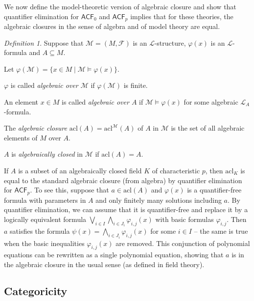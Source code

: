 \documentclass[a4paper, 11pt]{amsart}
\theoremstyle{remark}
\newtheorem{definition}[definition]{Definition}
\newcommand{\acl}{\mathrm{acl}}
\newcommand{\cF}{\mathcal F}
\newcommand{\cL}{\mathcal L}
\newcommand{\cM}{\mathcal M}
\newenvironment{enumerate-(a)}{\begin{enumerate}[label={\upshape (\alph*)}, leftmargin=2pc]}{\end{enumerate}}
\begin{document}
We now define the model-theoretic version of algebraic closure and show that quantifier elimination for $\mathsf{ACF}_0$ and $\mathsf{ACF}_p$ implies that for these theories, the algebraic closures in the sense of algebra and of model theory are equal.  

\begin{definition} 
Suppose that $\cM=(M,\cF)$ is an $\cL$-structure, $\varphi(x)$ is an $\cL$-formula and $A\subseteq M$. 
\begin{enumerate-(a)} 
\item 
Let $\varphi(\cM)=\{x\in M\mid\cM\models \varphi(x)\}$. 
\item 
$\varphi$ is called \emph{algebraic over $\cM$} if $\varphi(\cM)$ is finite. 
\item 
An element $x\in M$ is called \emph{algebraic over $A$} if $\cM\models \varphi(x)$ for some algebraic $\cL_A$-formula. 
\item 
The \emph{algebraic closure} $\acl(A)=\acl^\cM(A)$ of $A$ in $\cM$ is the set of all algebraic elements of $M$ over $A$. 
\item 
$A$ is \emph{algebraically closed} in $\cM$ if $\acl(A)=A$. 
\end{enumerate-(a)} 
\end{definition} 

If $A$ is a subset of an algebraically closed field $K$ of characteristic $p$, then $\acl_K$ is equal to the standard algebraic closure (from algebra) by quantifier elimination for $\mathsf{ACF}_p$. To see this, suppose that $a\in\acl(A)$ and $\varphi(x)$ is a quantifier-free formula with parameters in $A$ and only finitely many solutions including $a$. By quantifier elimination, we can assume that it is quantifier-free and replace it by a logically equivalent formula $\bigvee_{i\in I} \bigwedge_{i\in J_i} \varphi_{i,j}(x)$ with basic formulas $\varphi_{i,j}$. Then $a$ satisfies the formula $\psi(x)=\bigwedge_{i\in J_i} \varphi_{i,j}(x)$ for some $i\in I$ -- the same is true when the basic inequalities $\varphi_{i,j}(x)$ are removed. This conjunction of polynomial equations can be rewritten as a single polynomial equation, showing that $a$ is in the algebraic closure in the usual sense (as defined in field theory). 






\subsection{Categoricity} 
\end{document}
